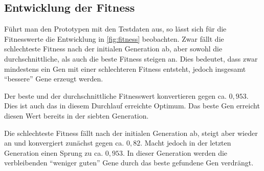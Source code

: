 
\subsection{Entwicklung der Fitness}

Führt man den Prototypen mit den Testdaten aus,
 so lässt sich für die Fitnesswerte die Entwicklung in \autoref{fig:fitness} beobachten.
Zwar fällt die schlechteste Fitness nach der initialen Generation ab,
aber sowohl die durchschnittliche, als auch die beste Fitness steigen an.
Dies bedeutet, dass zwar mindestens ein Gen mit einer schlechteren Fitness entsteht,
jedoch insgesamt \enquote{bessere} Gene erzeugt werden.

Der beste und der durchschnittliche Fitnesswert konvertieren gegen ca. $0,953$.
Dies ist auch das in diesem Durchlauf erreichte Optimum.
Das beste Gen erreicht diesen Wert bereits in der siebten Generation.

Die schlechteste Fitness fällt nach der initialen Generation ab,
steigt aber wieder an und konvergiert zunächst gegen ca. $0,82$.
Macht jedoch in der letzten Generation einen Sprung zu ca. $0,953$.
In dieser Generation werden die verbleibenden \enquote{weniger guten} Gene durch das beste gefundene Gen verdrängt.

